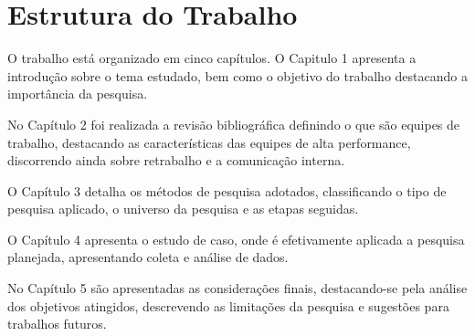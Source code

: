 \documentclass[
	12pt,
	openright,
	oneside, %
	a4paper,
	chapter=TITLE,
	section=TITLE,
	english,
	brazil %
	]{abntex2-udesc}
\begin{document}
\section{Estrutura do Trabalho}

O trabalho está organizado em cinco capítulos. O Capitulo 1 apresenta a introdução
sobre o tema estudado, bem como o objetivo do trabalho destacando a importância da
pesquisa.

No Capítulo 2 foi realizada a revisão bibliográfica definindo o que são equipes de
trabalho, destacando as características das equipes de alta performance, discorrendo ainda
sobre retrabalho e a comunicação interna.

O Capítulo 3 detalha os métodos de pesquisa adotados, classificando o tipo de pesquisa
aplicado, o universo da pesquisa e as etapas seguidas.

O Capítulo 4 apresenta o estudo de caso, onde é efetivamente aplicada a pesquisa
planejada, apresentando coleta e análise de dados.

No Capítulo 5 são apresentadas as considerações finais, destacando-se pela análise dos
objetivos atingidos, descrevendo as limitações da pesquisa e sugestões para trabalhos futuros.

\postextual



\end{document}
